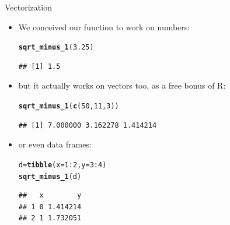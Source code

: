 \documentclass[unknownkeysallowed]{beamer}\usepackage[]{graphicx}\usepackage[]{color}
\makeatletter
\newcommand{\hlnum}[1]{\textcolor[rgb]{0.686,0.059,0.569}{#1}}%
\newcommand{\hlopt}[1]{\textcolor[rgb]{0,0,0}{#1}}%
\newcommand{\hlstd}[1]{\textcolor[rgb]{0.345,0.345,0.345}{#1}}%
\newcommand{\hlkwb}[1]{\textcolor[rgb]{0.69,0.353,0.396}{#1}}%
\newcommand{\hlkwc}[1]{\textcolor[rgb]{0.333,0.667,0.333}{#1}}%
\newcommand{\hlkwd}[1]{\textcolor[rgb]{0.737,0.353,0.396}{\textbf{#1}}}%
\newenvironment{kframe}{%
 \def\at@end@of@kframe{}%
 \ifinner\ifhmode%
  \def\at@end@of@kframe{\end{minipage}}%
  \begin{minipage}{\columnwidth}%
 \fi\fi%
 \def\FrameCommand##1{\hskip\@totalleftmargin \hskip-\fboxsep
 \colorbox{shadecolor}{##1}\hskip-\fboxsep
     \hskip-\linewidth \hskip-\@totalleftmargin \hskip\columnwidth}%
 \MakeFramed {\advance\hsize-\width
   \@totalleftmargin\z@ \linewidth\hsize
   \@setminipage}}%
 {\par\unskip\endMakeFramed%
 \at@end@of@kframe}
\newenvironment{knitrout}{}{} %
\makeatother
\begin{document}
\begin{frame}[fragile]{Vectorization}
  
  \begin{itemize}
  \item We conceived our function to work on numbers:
    
\begin{knitrout}
\color{fgcolor}\begin{kframe}
\begin{alltt}
\hlkwd{sqrt_minus_1}\hlstd{(}\hlnum{3.25}\hlstd{)}
\end{alltt}
\begin{verbatim}
## [1] 1.5
\end{verbatim}
\end{kframe}
\end{knitrout}

\item but it actually works on vectors too, as a free bonus of R:
  
\begin{knitrout}
\color{fgcolor}\begin{kframe}
\begin{alltt}
\hlkwd{sqrt_minus_1}\hlstd{(}\hlkwd{c}\hlstd{(}\hlnum{50}\hlstd{,}\hlnum{11}\hlstd{,}\hlnum{3}\hlstd{))}
\end{alltt}
\begin{verbatim}
## [1] 7.000000 3.162278 1.414214
\end{verbatim}
\end{kframe}
\end{knitrout}

\item or even data frames:
  
\begin{knitrout}
\color{fgcolor}\begin{kframe}
\begin{alltt}
\hlstd{d}\hlkwb{=}\hlkwd{tibble}\hlstd{(}\hlkwc{x}\hlstd{=}\hlnum{1}\hlopt{:}\hlnum{2}\hlstd{,}\hlkwc{y}\hlstd{=}\hlnum{3}\hlopt{:}\hlnum{4}\hlstd{)}
\hlkwd{sqrt_minus_1}\hlstd{(d)}
\end{alltt}
\begin{verbatim}
##   x        y
## 1 0 1.414214
## 2 1 1.732051
\end{verbatim}
\end{kframe}
\end{knitrout}
  \end{itemize}
  
\end{frame}
\end{document}
